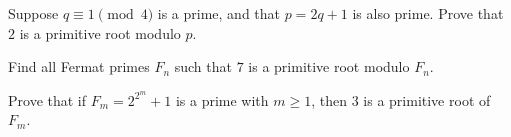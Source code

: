\documentclass{subfile}
\begin{document}
	\begin{problem}
		Suppose $q\equiv 1\pmod 4$ is a prime, and that $p=2q+1$ is also prime. Prove that $2$ is a primitive root modulo $p$. %
	\end{problem}



	\begin{problem}
		Find all Fermat primes $F_n$ such that $7$ is a primitive root modulo $F_n$. %
	\end{problem}


	\begin{problem}
		Prove that if $F_{m}=2^{2^{m}}+1$ is a prime with $m\geq{1}$, then $3$ is a primitive root of $F_{m}$. %
	\end{problem}

\end{document}
